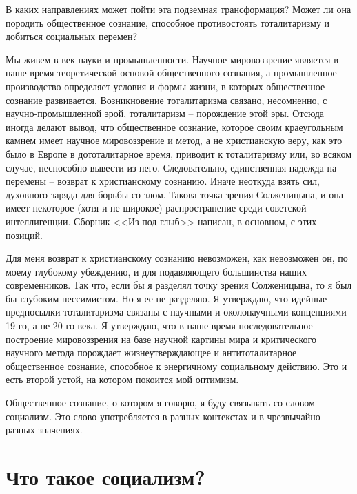 \documentclass{book}
\begin{document}
В каких направлениях может пойти эта подземная трансфор­мация? Может ли она породить общественное сознание, способ­ное противостоять тоталитаризму и добиться социальных пере­мен?

Мы живем в век науки и промышленности. Научное мировоззрение является в наше время теоретической основой общественного сознания, а промышленное производство определяет условия и формы жизни, в которых общественное сознание развивается. Возникновение тоталитаризма связано, несомненно, с научно-промышленной эрой, тоталитаризм -- порождение этой эры. Отсюда иногда делают вывод, что общественное сознание, которое своим краеугольным камнем имеет научное мировоззрение и метод, а не христианскую веру, как это было в Европе в дототалитарное время, приводит к тоталитаризму или, во всяком случае, неспособно вывести из него. Следовательно, единственная надежда на перемены -- возврат к хри­стианскому сознанию. Иначе неоткуда взять сил, духовного заряда для борьбы со злом. Такова точка зрения Солженицына, и она имеет некоторое (хотя и не широкое) распространение среди советской интеллигенции. Сборник <<Из-под глыб>> напи­сан, в основном, с этих позиций.

Для меня возврат к христианскому сознанию невозможен, как невозможен он, по моему глубокому убеждению, и для подавляющего большинства наших современников. Так что, если бы я разделял точку зрения Солженицына, то я был бы глубоким пессимистом. Но я ее не разделяю. Я утверждаю, что идейные предпосылки тоталитаризма связаны с научными и околонаучными концепциями 19-го, а не 20-го века. Я утверждаю, что в наше время последовательное построение мировоз­зрения на базе научной картины мира и критического научного метода порождает жизнеутверждающее и антитоталитарное общественное сознание, способное к энергичному социальному действию. Это и есть второй устой, на котором покоится мой оптимизм.

Общественное сознание, о котором я говорю, я буду связывать со словом социализм.  Это слово употребляется в разных контекстах и в чрезвычайно разных значениях.

\section{Что такое социализм?}
\end{document}
